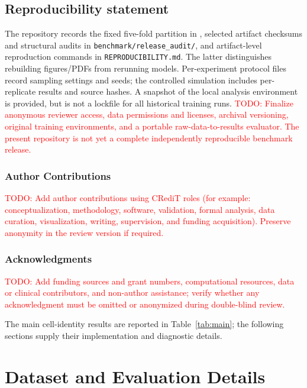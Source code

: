 \documentclass{article} %
\newcommand{\todo}[1]{\textcolor{red}{TODO: #1}}
\begin{document}
\subsection*{Reproducibility statement}

The repository records the fixed five-fold partition in
, selected artifact checksums and
structural audits in \texttt{benchmark/release\_audit/}, and artifact-level
reproduction commands in \texttt{REPRODUCIBILITY.md}. The latter distinguishes
rebuilding figures/PDFs from rerunning models. Per-experiment protocol files
record sampling settings and seeds; the controlled simulation includes
per-replicate results and source hashes. A snapshot of the local analysis
environment is provided, but is not a lockfile for all historical training runs.
\todo{Finalize anonymous reviewer access, data permissions and licenses,
archival versioning, original training environments, and a portable
raw-data-to-results evaluator. The present repository is not yet a complete
independently reproducible benchmark release.}

\subsubsection*{Author Contributions}

\noindent\todo{Add author contributions using CRediT roles (for example: conceptualization, methodology, software, validation, formal analysis, data curation, visualization, writing, supervision, and funding acquisition). Preserve anonymity in the review version if required.}

\subsubsection*{Acknowledgments}

\noindent\todo{Add funding sources and grant numbers, computational resources, data or clinical contributors, and non-author assistance; verify whether any acknowledgment must be omitted or anonymized during double-blind review.}




\appendix


The main cell-identity results are reported in Table~\ref{tab:main}; the
following sections supply their implementation and diagnostic details.

\section{Dataset and Evaluation Details}
\end{document}
